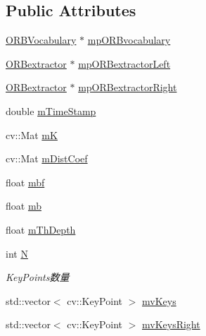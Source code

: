 \subsection*{Public Attributes}
\begin{DoxyCompactItemize}
\item 
\mbox{\hyperlink{namespace_o_r_b___s_l_a_m2_a2fafba714858cab1bb18d438e2e83c5d}{O\+R\+B\+Vocabulary}} $\ast$ \mbox{\hyperlink{class_o_r_b___s_l_a_m2_1_1_frame_a4c54c9963da838cd6fa83a65930bd1b7}{mp\+O\+R\+Bvocabulary}}
\item 
\mbox{\hyperlink{class_o_r_b___s_l_a_m2_1_1_o_r_bextractor}{O\+R\+Bextractor}} $\ast$ \mbox{\hyperlink{class_o_r_b___s_l_a_m2_1_1_frame_a5c4f28562114c30c6276f2e42aac6607}{mp\+O\+R\+Bextractor\+Left}}
\item 
\mbox{\hyperlink{class_o_r_b___s_l_a_m2_1_1_o_r_bextractor}{O\+R\+Bextractor}} $\ast$ \mbox{\hyperlink{class_o_r_b___s_l_a_m2_1_1_frame_a53cd56c00a153e8b54be49ea73b64672}{mp\+O\+R\+Bextractor\+Right}}
\item 
double \mbox{\hyperlink{class_o_r_b___s_l_a_m2_1_1_frame_a7987de59d3b4bf655614e19db0c90278}{m\+Time\+Stamp}}
\item 
cv\+::\+Mat \mbox{\hyperlink{class_o_r_b___s_l_a_m2_1_1_frame_a6508d43259538370dcb77911122dc85b}{mK}}
\item 
cv\+::\+Mat \mbox{\hyperlink{class_o_r_b___s_l_a_m2_1_1_frame_aef15cff1b0d7572f49975d3200ffd140}{m\+Dist\+Coef}}
\item 
float \mbox{\hyperlink{class_o_r_b___s_l_a_m2_1_1_frame_afb4090340565194b372b2ce0d95f16fb}{mbf}}
\item 
float \mbox{\hyperlink{class_o_r_b___s_l_a_m2_1_1_frame_a950131e5ed7fca2a73fc5a50e6d9b2de}{mb}}
\item 
float \mbox{\hyperlink{class_o_r_b___s_l_a_m2_1_1_frame_a15e0251e1e18b84f385ad817f0e8ba1a}{m\+Th\+Depth}}
\item 
int \mbox{\hyperlink{class_o_r_b___s_l_a_m2_1_1_frame_a0035828f1744f1bdd4ae8681e7cbbd32}{N}}
\begin{DoxyCompactList}\small\item\em Key\+Points数量 \end{DoxyCompactList}\item 
std\+::vector$<$ cv\+::\+Key\+Point $>$ \mbox{\hyperlink{class_o_r_b___s_l_a_m2_1_1_frame_a86563de6facec0433e31f726723057e4}{mv\+Keys}}
\item 
std\+::vector$<$ cv\+::\+Key\+Point $>$ \mbox{\hyperlink{class_o_r_b___s_l_a_m2_1_1_frame_a15b04baf8fc5282883ccc002eb703a8e}{mv\+Keys\+Right}}

\end{DoxyCompactItemize}
